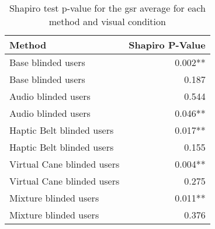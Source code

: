 
\begin{table}[!htb]
\centering
\caption{Shapiro test p-value for the gsr average for each method and visual condition}
\label{tab:shapiro_gsr_avg}
\begin{tabular}{lr}
\toprule
                    Method & Shapiro P-Value \\
\midrule
        Base blinded users &         0.002** \\
        Base blinded users &           0.187 \\
       Audio blinded users &           0.544 \\
       Audio blinded users &         0.046** \\
 Haptic Belt blinded users &         0.017** \\
 Haptic Belt blinded users &           0.155 \\
Virtual Cane blinded users &         0.004** \\
Virtual Cane blinded users &           0.275 \\
     Mixture blinded users &         0.011** \\
     Mixture blinded users &           0.376 \\
\bottomrule
\end{tabular}
\end{table}

